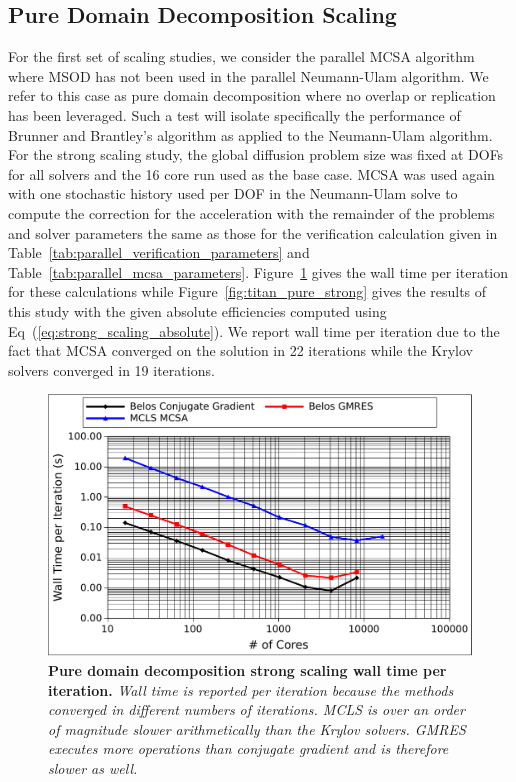\subsection{Pure Domain Decomposition Scaling}
\label{subsec:pure_domain_decomp}

For the first set of scaling studies, we consider the parallel MCSA
algorithm where MSOD has not been used in the parallel Neumann-Ulam
algorithm. We refer to this case as pure domain decomposition where no
overlap or replication has been leveraged. Such a test will isolate
specifically the performance of Brunner and Brantley's algorithm as
applied to the Neumann-Ulam algorithm. For the strong scaling study,
the global diffusion problem size was fixed at  DOFs for
all solvers and the 16 core run used as the base case. MCSA was used
again with one stochastic history used per DOF in the Neumann-Ulam
solve to compute the correction for the acceleration with the
remainder of the problems and solver parameters the same as those for
the verification calculation given in
Table~\ref{tab:parallel_verification_parameters} and
Table~\ref{tab:parallel_mcsa_parameters}. Figure~\ref{fig:titan_pure_strong_time}
gives the wall time per iteration for these calculations while
Figure~\ref{fig:titan_pure_strong} gives the results of this study
with the given absolute efficiencies computed using
Eq~(\ref{eq:strong_scaling_absolute}). We report wall time per
iteration due to the fact that MCSA converged on the solution in 22
iterations while the Krylov solvers converged in 19 iterations.

\begin{figure}[t!]
  \begin{center}
    \includegraphics[width=6in]{chapters/parallel_mc/titan_pure_strong_time.pdf}
  \end{center}
  \caption{\textbf{Pure domain decomposition strong scaling wall time
      per iteration.} \textit{Wall time is reported per iteration
      because the methods converged in different numbers of
      iterations. MCLS is over an order of magnitude slower
      arithmetically than the Krylov solvers. GMRES executes more
      operations than conjugate gradient and is therefore slower as
      well.}}
  \label{fig:titan_pure_strong_time}
\end{figure}

